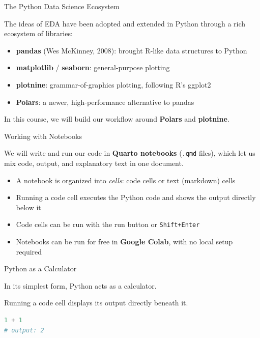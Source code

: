 \documentclass[8pt,aspectratio=169]{beamer}
\begin{document}
\begin{textframe}{The Python Data Science Ecosystem}

The ideas of EDA have been adopted and extended in Python through a rich ecosystem of libraries:

\begin{itemize}
\item \textbf{pandas} (Wes McKinney, 2008): brought R-like data structures to Python
\item \textbf{matplotlib} / \textbf{seaborn}: general-purpose plotting
\item \textbf{plotnine}: grammar-of-graphics plotting, following R's ggplot2
\item \textbf{Polars}: a newer, high-performance alternative to pandas
\end{itemize}

In this course, we will build our workflow around \textbf{Polars} and \textbf{plotnine}.

\end{textframe}

\begin{textframe}{Working with Notebooks}

We will write and run our code in \textbf{Quarto notebooks} (\texttt{.qmd} files), which let us mix code, output, and explanatory text in one document.

\begin{itemize}
\item A notebook is organized into \textit{cells}: code cells or text (markdown) cells
\item Running a code cell executes the Python code and shows the output directly below it
\item Code cells can be run with the run button or \texttt{Shift+Enter}
\item Notebooks can be run for free in \textbf{Google Colab}, with no local setup required
\end{itemize}

\end{textframe}

\begin{frame}[fragile]{Python as a Calculator}
\begin{splitcode}{%

In its simplest form, Python acts as a calculator.

Running a code cell displays its output directly beneath it.

}
\begin{lstlisting}[language=Python]
1 + 1
# output: 2
\end{lstlisting}
\end{splitcode}
\end{frame}
\end{document}
